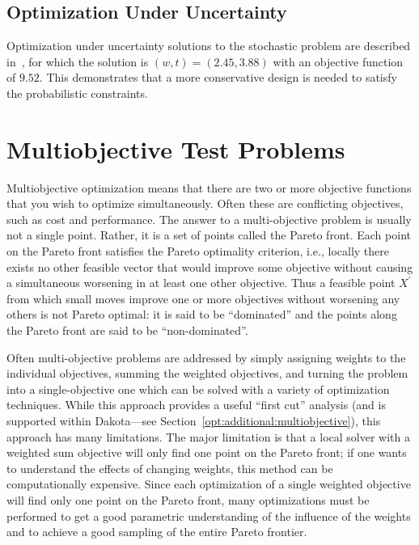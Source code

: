 \subsection{Optimization Under Uncertainty}
Optimization under uncertainty solutions to the
stochastic problem are described in~\cite{Eld02,Eld05,Eld06a}, for
which the solution is $(w,t)=(2.45,3.88)$ with an objective function
of $9.52$. This demonstrates that a more conservative design is
needed to satisfy the probabilistic constraints.

\section{Multiobjective Test Problems}\label{additional:multiobjective}

Multiobjective optimization means that there are two or more
objective functions that you wish to optimize simultaneously. Often
these are conflicting objectives, such as cost and performance. The
answer to a multi-objective problem is usually not a single point.
Rather, it is a set of points called the Pareto front. Each point
on the Pareto front satisfies the Pareto optimality criterion, i.e.,
locally there exists no other feasible vector that would improve some
objective without causing a simultaneous worsening in at least one
other objective. Thus a feasible point $X^\prime$ from which
small moves improve one or more objectives without worsening
any others is not Pareto optimal: it is said to be ``dominated''
and the points along the Pareto front are said to be
``non-dominated''.

Often multi-objective problems are addressed by simply assigning
weights to the individual objectives, summing the weighted objectives,
and turning the problem into a single-objective one which can be
solved with a variety of optimization techniques. While this approach
provides a useful ``first cut'' analysis (and is supported within
Dakota---see Section~\ref{opt:additional:multiobjective}), this
approach has many limitations. The major limitation is that a local
solver with a weighted sum objective will only find one
point on the Pareto front; if one wants to understand
the effects of changing weights, this method can be computationally
expensive. Since each optimization of a single weighted objective
will find only one point on the Pareto front, many
optimizations must be performed to get a good parametric
understanding of the influence of the weights and to achieve a good
sampling of the entire Pareto frontier.

